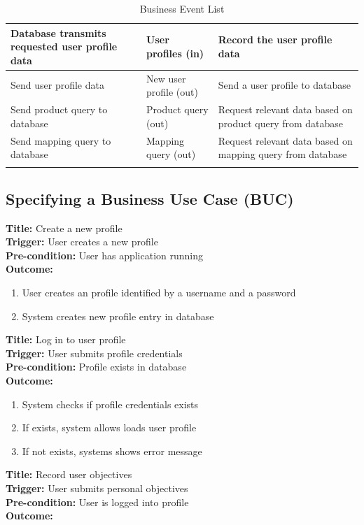 \documentclass[12pt]{article}
\begin{document}
\begin{longtable}{| >{\raggedright\arraybackslash}p{} | >{\raggedright\arraybackslash}p{} | >{\raggedright\arraybackslash}p{} |}
        \hline
        Database transmits requested user profile data & User profiles (in) &  Record the user profile data \\
        \hline
        Send user profile data & New user profile (out) &  Send a user profile to database \\
        \hline
        Send product query to database & Product query (out) & Request relevant data based on product query from database \\
        \hline
        Send mapping query to database  & Mapping query (out) &  Request relevant data based on mapping query from database \\
        \hline 
        \caption{Business Event List}
        \label{tab:businesseventlist}
    \end{longtable}
\subsection{Specifying a Business Use Case (BUC)}
\textbf{Title:} Create a new profile\\
\textbf{Trigger:} User creates a new profile\\
\textbf{Pre-condition:} User has application running\\
\textbf{Outcome: } 
\begin{enumerate}
    \item User creates an profile identified by a username and a password
    \item System creates new profile entry in database
\end{enumerate}
\textbf{Title:} Log in to user profile\\
\textbf{Trigger:} User submits profile credentials \\
\textbf{Pre-condition:} Profile exists in database \\
\textbf{Outcome: } 
\begin{enumerate}
    \item System checks if profile credentials exists
    \item If exists, system allows loads user profile
    \item If not exists, systems shows error message
\end{enumerate}
\textbf{Title:} Record user objectives \\
\textbf{Trigger:} User submits personal objectives \\
\textbf{Pre-condition:} User is logged into profile \\
\textbf{Outcome: } 
\end{document}
